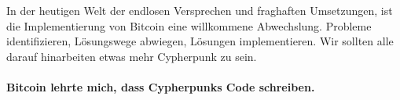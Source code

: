 In der heutigen Welt der endlosen Versprechen und fraghaften Umsetzungen, ist die
Implementierung von Bitcoin eine willkommene Abwechslung. Probleme
identifizieren, Lösungswege abwiegen, Lösungen implementieren. Wir sollten alle
darauf hinarbeiten etwas mehr Cypherpunk zu sein.

\paragraph{Bitcoin lehrte mich, dass Cypherpunks Code schreiben.}

%
%
%
%
